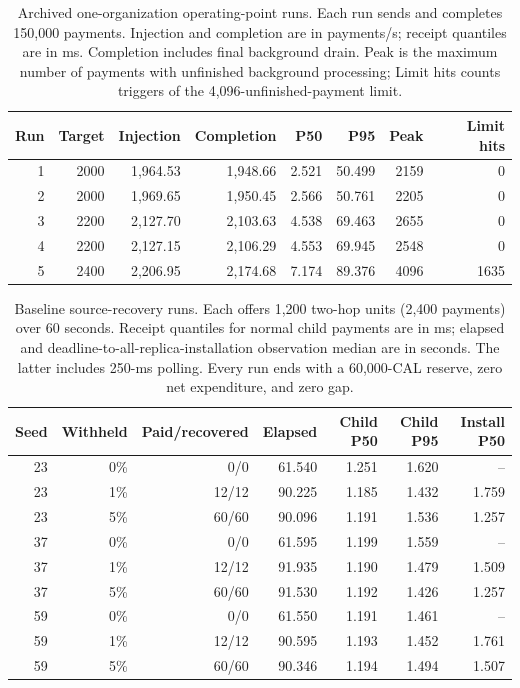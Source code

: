 \begin{table}[!ht]
\centering\small
\caption{Archived one-organization operating-point runs. Each run sends and completes 150,000 payments. Injection and completion are in payments/s; receipt quantiles are in ms. Completion includes final background drain. Peak is the maximum number of payments with unfinished background processing; Limit hits counts triggers of the 4,096-unfinished-payment limit.}
\label{tab:supp-throughput}
\begin{tabular}{@{}rrrrrrrr@{}}
\toprule
Run & Target & Injection & Completion & P50 & P95 & Peak & Limit hits \\
\midrule
1 & 2000 & 1,964.53 & 1,948.66 & 2.521 & 50.499 & 2159 & 0 \\
2 & 2000 & 1,969.65 & 1,950.45 & 2.566 & 50.761 & 2205 & 0 \\
3 & 2200 & 2,127.70 & 2,103.63 & 4.538 & 69.463 & 2655 & 0 \\
4 & 2200 & 2,127.15 & 2,106.29 & 4.553 & 69.945 & 2548 & 0 \\
5 & 2400 & 2,206.95 & 2,174.68 & 7.174 & 89.376 & 4096 & 1635 \\
\bottomrule
\end{tabular}
\end{table}
\begin{table}[!ht]
\centering\small
\caption{Baseline source-recovery runs. Each offers 1,200 two-hop units (2,400 payments) over 60 seconds. Receipt quantiles for normal child payments are in ms; elapsed and deadline-to-all-replica-installation observation median are in seconds. The latter includes 250-ms polling. Every run ends with a 60,000-CAL reserve, zero net expenditure, and zero gap.}
\label{tab:supp-liability}
\begin{tabular}{@{}rrrrrrr@{}}
\toprule
Seed & Withheld & Paid/recovered & Elapsed & Child P50 & Child P95 & Install P50 \\
\midrule
23 & 0\% & 0/0 & 61.540 & 1.251 & 1.620 & -- \\
23 & 1\% & 12/12 & 90.225 & 1.185 & 1.432 & 1.759 \\
23 & 5\% & 60/60 & 90.096 & 1.191 & 1.536 & 1.257 \\
37 & 0\% & 0/0 & 61.595 & 1.199 & 1.559 & -- \\
37 & 1\% & 12/12 & 91.935 & 1.190 & 1.479 & 1.509 \\
37 & 5\% & 60/60 & 91.530 & 1.192 & 1.426 & 1.257 \\
59 & 0\% & 0/0 & 61.550 & 1.191 & 1.461 & -- \\
59 & 1\% & 12/12 & 90.595 & 1.193 & 1.452 & 1.761 \\
59 & 5\% & 60/60 & 90.346 & 1.194 & 1.494 & 1.507 \\
\bottomrule
\end{tabular}
\end{table}

